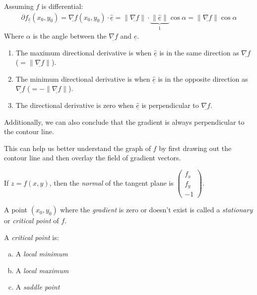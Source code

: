 \documentclass[00_complete]{subfiles}
\begin{document}
Assuming $f$ is differential:
\begin{gather*}
    \partial f_{\hat{\underline e}}(x_0,y_0)=\underline{\nabla f}(x_0,y_0)\cdot
    \underline{\hat e} = \|\underline{\nabla f}\|\cdot \underbrace{\|\hat{\underline
    e}\|}_{1}\cos \alpha = \|\underline {\nabla f}\|\cos \alpha
\end{gather*}
Where $\alpha$ is the angle between the $\underline{\nabla f}$ and $\hat{\underline
e}$.
\begin{conclusion}
    \begin{enumerate}
    \item The maximum directional derivative is when $\hat{\underline
    e}$ is in the same direction as $\underline{\nabla f}$
    ($=\|\underline{\nabla f}\|$).
    \item The minimum directional derivative is when $\hat{\underline
    e}$ is in the opposite direction as $\underline{\nabla f}$
    ($=-\|\underline{\nabla f}\|$).
    \item The directional derivative is zero when $\hat{\underline
    e}$ is perpendicular to $\underline{\nabla f}$.
    \end{enumerate}
    Additionally, we can also conclude that the gradient is always
    perpendicular to the contour line.
\end{conclusion}
This can help us better understand the graph of $f$ by first drawing out the
contour line and then overlay the field of gradient vectors.
\begin{note}
    If $z=f(x,y)$, then the \emph{normal} of the tangent plane is
    $\begin{pmatrix}
        f_x\\f_y\\-1
    \end{pmatrix}$.
\end{note}
\begin{definition}
    A point $(x_0,y_0)$ where the \emph{gradient} is zero or doesn't exist is
    called a \emph{stationary} or \emph{critical point} of $f$.

    A \emph{critical point} is:
    \begin{enumerate}[a.] \tightlist
        \item A \emph{local minimum}
        \item A \emph{local maximum}
        \item A \emph{saddle point}
    \end{enumerate}
\end{definition}
\end{document}
